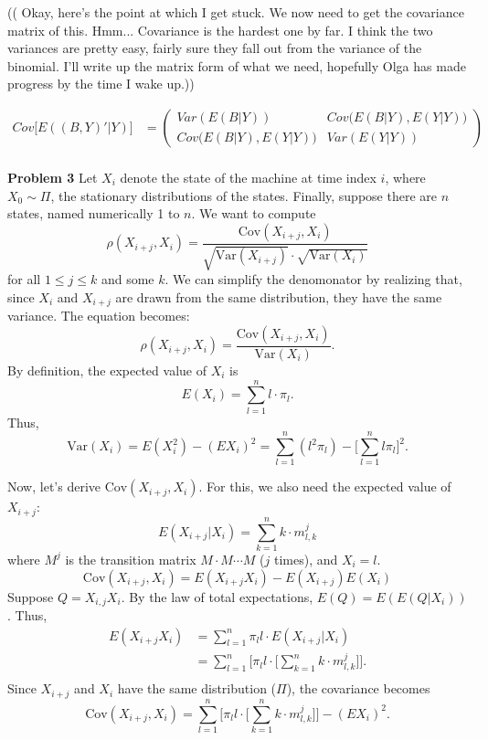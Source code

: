 \documentclass[12pt]{article}
\begin{document}
(( Okay, here's the point at which I get stuck. We now need to get the covariance matrix of this. Hmm... Covariance is the hardest one by far. I think the two variances are pretty easy, fairly sure they fall out from the variance of the binomial. I'll write up the matrix form of what we need, hopefully Olga has made progress by the time I wake up.))

\begin{equation*}
	\begin{aligned}
		Cov\big[E((B,Y)' | Y)\big] &=
		 \left(
		\begin{array}{cc}
			Var(E(B|Y)) & Cov\big(E(B|Y),E(Y|Y)\big)\\
			Cov\big(E(B|Y),E(Y|Y)\big) & Var(E(Y|Y))
		\end{array}
		\right) \\
	\end{aligned}
\end{equation*}




\pagebreak
\textbf{Problem 3} 
Let $X_i$ denote the state of the machine at time index $i$, where $X_0  
\sim \Pi$, the stationary distributions of the states. Finally, suppose there are $n$ states, 
named numerically 1 to $n$. We want to compute
$$\rho(X_{i+j}, X_i) = \frac{\text{Cov}(X_{i+j}, X_i)}
                 {\sqrt{\text{Var}(X_{i+j})} \cdot \sqrt{\text{Var}(X_i)}} $$ 
for all $1 \le j \le k$ and some $k$. We can simplify the denomonator by realizing 
that, since $X_i$ and $X_{i+j}$ are drawn from the same distribution, they have
the same variance. The equation becomes: 
$$\rho(X_{i+j}, X_i) = \frac{\text{Cov}(X_{i+j}, X_i)}
                 {\text{Var}(X_{i})}. $$
By definition, the expected value of $X_i$ is
$$ E(X_i) = \sum_{l=1}^n{l\cdot\pi_l}. $$ 
Thus, 
$$ \text{Var}(X_i) = E(X_i^2) - (EX_i)^2 =
  \sum_{l=1}^n{(l^2\pi_l)} - \Big[ \sum_{l=1}^n{l \pi_l} \Big]^2.$$ 

Now, let's derive $\text{Cov}(X_{i+j}, X_i)$. For this, we also need the expected
value of $X_{i+j}$:
$$ E(X_{i+j} | X_i) = \sum_{k=1}^n{k \cdot m^j_{l,k}} $$
where $M^j$ is the transition matrix $M \cdot M \cdots M$ ($j$ times), and 
$X_i = l$. 
$$ \text{Cov}(X_{i+j}, X_i) = E(X_{i+j}X_i) - E(X_{i+j})E(X_i) $$
Suppose $Q = X_{i,j}X_i$. By the law of total expectations, $ E(Q) = E(E(Q|X_i))$.
Thus, 
\begin{equation*}
  \begin{aligned}
    E(X_{i+j}X_i) &= \sum_{l=1}^n{ \pi_l l \cdot E(X_{i+j} | X_i)} \\
                  &= \sum_{l=1}^n{ \Bigg[ \pi_l l \cdot \Big[ 
                         \sum_{k=1}^n{k \cdot m^j_{l,k}} \Big]} \Bigg]. \\
  \end{aligned}
\end{equation*}
Since $X_{i+j}$ and $X_i$ have the same distribution ($\Pi$), the covariance becomes
$$ \text{Cov}(X_{i+j}, X_i) =  \sum_{l=1}^n{ \Bigg[ \pi_l l \cdot \Big[ 
                                     \sum_{k=1}^n{k \cdot m^j_{l,k}} \Big]} \Bigg]
                              - (EX_i)^2.$$
\end{document}
